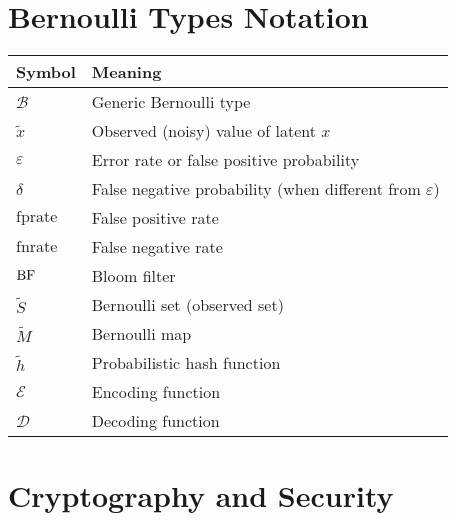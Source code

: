 \section{Bernoulli Types Notation}

\begin{center}
\begin{tabular}{|l|l|}
\hline
\textbf{Symbol} & \textbf{Meaning} \\
\hline
$\mathcal{B}$ & Generic Bernoulli type \\
$\tilde{x}$ & Observed (noisy) value of latent $x$ \\
$\varepsilon$ & Error rate or false positive probability \\
$\delta$ & False negative probability (when different from $\varepsilon$) \\
$\text{fprate}$ & False positive rate \\
$\text{fnrate}$ & False negative rate \\
$\text{BF}$ & Bloom filter \\
$\tilde{S}$ & Bernoulli set (observed set) \\
$\tilde{M}$ & Bernoulli map \\
$\tilde{h}$ & Probabilistic hash function \\
$\mathcal{E}$ & Encoding function \\
$\mathcal{D}$ & Decoding function \\
\hline
\end{tabular}
\end{center}

\section{Cryptography and Security}

